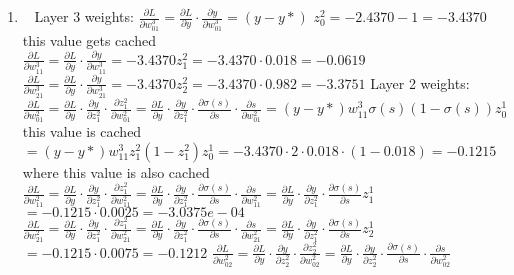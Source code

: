 \documentclass[12pt, fullpage,letterpaper]{article}
\begin{document}
\begin{enumerate}
	\item~
	\newline Layer 3 weights:
	\newline  $\frac{\partial L}{\partial w^3_{01}}=\frac{\partial L}{\partial y}\cdot\frac{\partial y}{\partial w^3_{01}}=(y-y*)$
	\newline  $z^2_0=-2.4370-1=-3.4370$ this value gets cached
	\newline  $\frac{\partial L}{\partial w^3_{11}}=\frac{\partial L}{\partial y}\cdot\frac{\partial y}{\partial w^3_{11}}=-3.4370z^2_1=-3.4370\cdot0.018=-0.0619$
	\newline  $\frac{\partial L}{\partial w^3_{21}}=\frac{\partial L}{\partial y}\cdot\frac{\partial y}{\partial w^3_{21}}=-3.4370z^2_2=-3.4370\cdot0.982=-3.3751$
	\newline Layer 2 weights:
	\newline $\frac{\partial L}{\partial w^2_{01}}=\frac{\partial L}{\partial y}\cdot\frac{\partial y}{\partial z^2_1}\cdot\frac{\partial z^2_1}{\partial w^2_{01}}=\frac{\partial L}{\partial y}\cdot\frac{\partial y}{\partial z^2_1}\cdot\frac{\partial\sigma(s)}{\partial s}\cdot\frac{\partial s}{\partial w^2_{01}}=(y-y*)w^3_{11}\sigma(s)(1-\sigma(s))z^1_0$ this value is cached
	\newline $=(y-y*)w^3_{11}z^2_1(1-z^2_1)z^1_0=-3.4370\cdot2\cdot0.018\cdot(1-0.018)=-0.1215$ where this value is also cached 
	\newline $\frac{\partial L}{\partial w^2_{11}}=\frac{\partial L}{\partial y}\cdot\frac{\partial y}{\partial z^2_1}\cdot\frac{\partial z^2_1}{\partial w^2_{11}}=\frac{\partial L}{\partial y}\cdot\frac{\partial y}{\partial z^2_1}\cdot\frac{\partial\sigma(s)}{\partial s}\cdot\frac{\partial s}{\partial w^2_{11}}=\frac{\partial L}{\partial y}\cdot\frac{\partial y}{\partial z^2_1}		  			\cdot\frac{\partial\sigma(s)}{\partial s}z^1_1$
	\newline $=-0.1215\cdot0.0025=-3.0375e-04$
	\newline $\frac{\partial L}{\partial w^2_{21}}=\frac{\partial L}{\partial y}\cdot\frac{\partial y}{\partial z^2_1}\cdot\frac{\partial z^2_1}{\partial w^2_{21}}=\frac{\partial L}{\partial y}\cdot\frac{\partial y}{\partial z^2_1}\cdot\frac{\partial\sigma(s)}{\partial s}\cdot\frac{\partial s}{\partial w^2_{21}}=\frac{\partial L}{\partial y}\cdot\frac{\partial y}{\partial z^2_1}		  			\cdot\frac{\partial\sigma(s)}{\partial s}z^1_2$
	\newline $=-0.1215\cdot0.0075=-0.1212$
	\newline $\frac{\partial L}{\partial w^2_{02}}=\frac{\partial L}{\partial y}\cdot\frac{\partial y}{\partial z^2_2}\cdot\frac{\partial z^2_2}{\partial w^2_{02}}=\frac{\partial L}{\partial y}\cdot\frac{\partial y}{\partial z^2_2}\cdot\frac{\partial\sigma(s)}{\partial s}\cdot\frac{\partial s}{\partial w^2_{02}}$

\end{enumerate}
\end{document}
